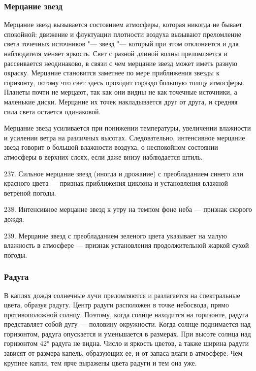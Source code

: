 \subsubsection{Мерцание звезд}

Мерцание звезд вызывается состоянием атмосферы, которая никогда не бывает спокойной: движение и флуктуации плотности воздуха вызывают преломление света точечных источников "--- звезд "--- который при этом отклоняется и для наблюдателя меняет яркость. Свет с разной длиной волны преломляется и рассеивается неодинаково, в связи с чем мерцание звезд может иметь разную окраску. Мерцание становится заметнее по мере приближения звезды к горизонту, потому что свет здесь проходит гораздо большую толщу атмосферы. Планеты почти не мерцают, так как они видны не как точечные источники, а маленькие диски. Мерцание их точек накладывается друг от друга, и средняя сила света остается одинаковой.

Мерцание звезд усиливается при понижении температуры, увеличении влажности и усилении ветра на различных высотах. Следовательно, интенсивное мерцание звезд говорит о большой влажности воздуха, о неспокойном состоянии атмосферы в верхних слоях, если даже внизу наблюдается штиль.

237. Сильное мерцание звезд (иногда и дрожание) с преобладанием синего или красного цвета — признак приближения циклона и установления влажной ветреной погоды.

238. Интенсивное мерцание звезд к утру на темпом фоне неба — признак скорого дождя.

239. Мерцание звезд с преобладанием зеленого цвета указывает на малую влажность в атмосфере — признак установления продолжительной жаркой сухой погоды.

\subsubsection{Радуга}

В каплях дождя солнечные лучи преломляются и разлагается на спектральные цвета, образуя радугу. Центр радуги расположен в точке небосвода, прямо противоположной солнцу. Поэтому, когда солнце находится на горизонте, радуга представляет собой дугу — половину окружности. Когда солнце поднимается над горизонтом, радуга опускается и уменьшается в размерах. При высоте солнца над горизонтом 42° радуга не видна. Число и яркость цветов, а также ширина радуги зависят от размера капель, образующих ее, и от запаса влаги в атмосфере. Чем крупнее капли, тем ярче выражены цвета радуги и тем она уже.

